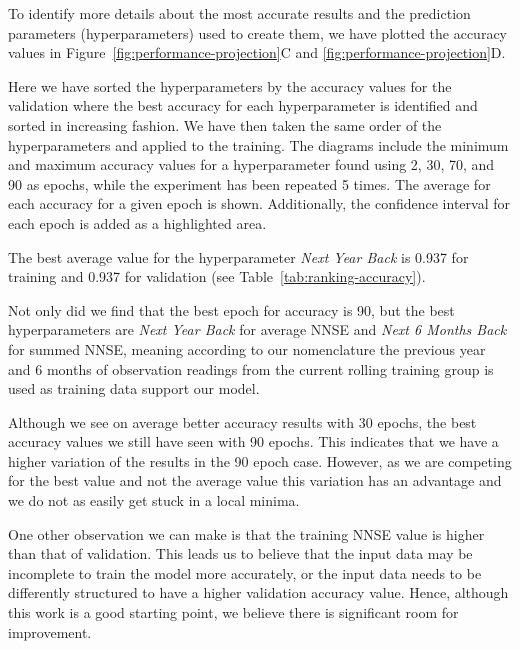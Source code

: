 \documentclass[utf8]{FrontiersinVancouver} %
\begin{document}

        
To identify more details about the most accurate results and the prediction parameters (hyperparameters) used to create them, we have plotted the accuracy values in Figure~\ref{fig:performance-projection}C and \ref{fig:performance-projection}D.

Here we have sorted the hyperparameters by the accuracy values for the validation where the best accuracy for each hyperparameter is identified and sorted in increasing fashion. We have then taken the same order of the hyperparameters and applied to the training.  The diagrams include the minimum and maximum accuracy values for a hyperparameter found using 2, 30, 70, and 90 as epochs, while the experiment has been repeated 5 times. The average for each accuracy for a given epoch is shown. Additionally, the confidence interval for each epoch is added as a highlighted area.

The best average value for the hyperparameter {\em Next Year Back} is 0.937 for training and 0.937 for validation (see Table~\ref{tab:ranking-accuracy}).

Not only did we find that the best epoch for accuracy is 90, but the best hyperparameters are {\em Next Year Back} for average NNSE and {\em Next 6 Months Back} for summed NNSE, meaning according to our nomenclature the previous year and 6 months of observation readings from the current rolling training group is used as training data support our model.

Although we see on average better accuracy results with 30 epochs, the best accuracy values we still have seen with 90 epochs. This indicates that we have a higher variation of the results in the 90 epoch case. However, as we are competing for the best value and not the average value this variation has an advantage and we do not as easily get stuck in a local minima.

One other observation we can make is that the training NNSE value is higher than that of validation. This leads us to believe that the input data may be incomplete to train the model more accurately, or the input data needs to be differently structured to have a higher validation accuracy value.  Hence, although this work is a good starting point, we believe there is significant room for improvement.
\end{document}
